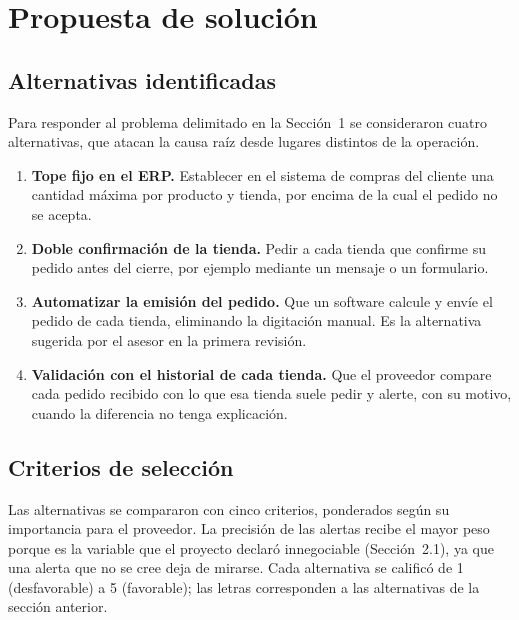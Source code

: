 
\section{Propuesta de solución}
\label{sec:propuesta}

\subsection{Alternativas identificadas}

Para responder al problema delimitado en la Sección~1 se consideraron cuatro alternativas, que atacan la causa raíz desde lugares distintos de la operación.

\begin{enumerate}[label=\textbf{\Alph*.}]
\item \textbf{Tope fijo en el ERP.} Establecer en el sistema de compras del cliente una cantidad máxima por producto y tienda, por encima de la cual el pedido no se acepta.
\item \textbf{Doble confirmación de la tienda.} Pedir a cada tienda que confirme su pedido antes del cierre, por ejemplo mediante un mensaje o un formulario.
\item \textbf{Automatizar la emisión del pedido.} Que un software calcule y envíe el pedido de cada tienda, eliminando la digitación manual. Es la alternativa sugerida por el asesor en la primera revisión.
\item \textbf{Validación con el historial de cada tienda.} Que el proveedor compare cada pedido recibido con lo que esa tienda suele pedir y alerte, con su motivo, cuando la diferencia no tenga explicación.
\end{enumerate}

\subsection{Criterios de selección}

Las alternativas se compararon con cinco criterios, ponderados según su importancia para el proveedor. La precisión de las alertas recibe el mayor peso porque es la variable que el proyecto declaró innegociable (Sección~2.1), ya que una alerta que no se cree deja de mirarse. Cada alternativa se calificó de 1 (desfavorable) a 5 (favorable); las letras corresponden a las alternativas de la sección anterior.

